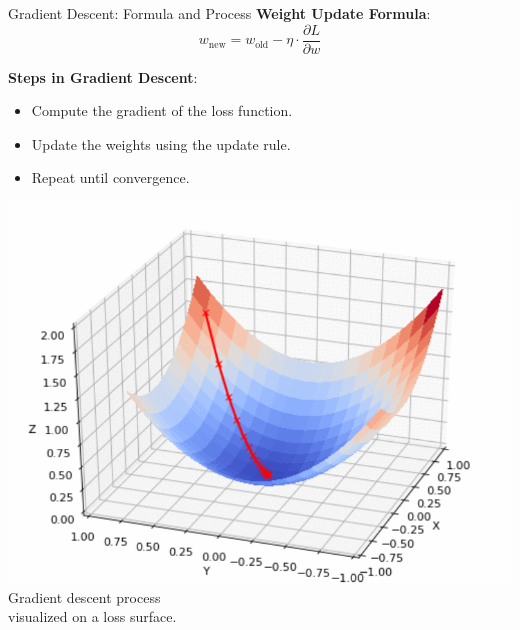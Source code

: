 \documentclass[serif, aspectratio=169]{beamer}
\begin{document}
\begin{frame}{Gradient Descent: Formula and Process}
    \textbf{Weight Update Formula}:
    \[
    w_{\text{new}} = w_{\text{old}} - \eta \cdot \frac{\partial L}{\partial w}
    \]

    \textbf{Steps in Gradient Descent}:
    \begin{itemize}
        \item Compute the gradient of the loss function.
        \item Update the weights using the update rule.
        \item Repeat until convergence.
    \end{itemize}
    
    \vspace{-2cm} %
    \begin{flushright}
        \includegraphics[scale=0.3]{pic/GD.png} %
        \\{Gradient descent process\\ visualized on a loss surface.}
    \end{flushright}

\end{frame}
\end{document}
